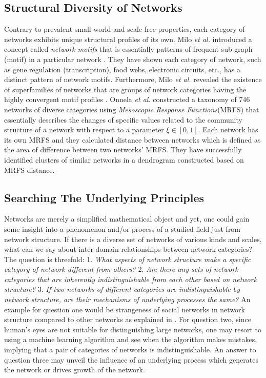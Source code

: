 \documentclass{article}
\begin{document}
	\subsection{Structural Diversity of Networks}
	Contrary to prevalent small-world and scale-free properties, each category of networks exhibits unique structural profiles of its own. Milo \textit{et al.} introduced a concept called \textit{network motifs} that is essentially patterns of frequent  sub-graph (motif) in a particular network \cite{Milo_motif}. They have shown each category of network, such as gene regulation (transcription), food webs, electronic circuits, etc., has a distinct pattern of network motifs. Furthermore, Milo \textit{et al.} revealed the existence of superfamilies of networks that  are groups of network categories having the highly convergent motif profiles \cite{Milo_SuperFamily}. Onnela \textit{et al.} constructed a taxonomy of 746 networks  of diverse categories using \textit{Mesoscopic Response Functions}(MRFS) that essentially describes the changes of specific values related to the community structure of a network with respect to a parameter $\xi \in [0,1]$\cite{Onnela_Taxonomy}. Each network has its own MRFS and they calculated distance between networks which is defined as the area of difference between two networks' MRFS. They have successfully identified clusters of similar networks in a dendrogram constructed based on MRFS distance.
	
	\subsection{Searching The Underlying Principles}
Networks are merely a simplified mathematical object and yet, one could gain some insight into a phenomenon and/or process of a studied field just from network structure. 
If there is a diverse set of networks of various kinds and scales, what can we say about inter-domain relationships between network categories? The question is threefold: 1. \textit{What aspects of network structure make a specific category of network different from others?} 2. \textit{Are there any sets of network categories that are inherently indistinguishable from each other based on network structure?} 3. \textit{If two networks of different categories are indistinguishable by network structure, are their mechanisms of underlying processes the same?} An example for question one would be strangeness of social networks in network structure compared to other networks as explained in \cite{WhySocialNetworks}.  For question two, since human's eyes are not suitable for distinguishing large networks, one may resort to using a machine learning algorithm and see when the algorithm makes mistakes, implying that a pair of categories of networks is indistinguishable.  An answer to question three may unveil the influence of an underlying process which generates the network or drives growth of the network.
\end{document}

